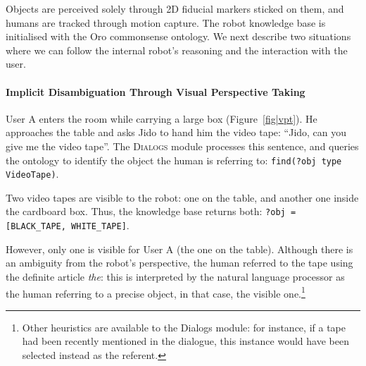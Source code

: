 \documentclass[preprint,3p,times]{elsarticle}
\newcommand{\concept}[1]{{\small \texttt{#1}}}
\begin{document}
Objects are perceived solely through 2D fiducial markers sticked on them, and humans are
tracked through motion capture. The robot knowledge base is initialised with
the {\sc Oro} commonsense ontology.  We next describe two
situations where we can follow the internal robot's reasoning and the
interaction with the user.

\paragraph{Implicit Disambiguation Through Visual Perspective Taking}

\begin{figure}[!ht]
  \centering
\end{figure}


User A enters the room while carrying a large box (Figure~\ref{fig|vpt}). He
approaches the table and asks Jido to hand him the video tape: ``Jido, can
you give me the video tape''. The \textsc{Dialogs} module processes this
sentence, and queries the ontology to
identify the object the human is referring to: \concept{find(?obj type
VideoTape)}. 

Two video tapes are visible to the robot: one on the table, and another one
inside the cardboard box. Thus, the knowledge base returns both: 
\concept{?obj = [BLACK\_TAPE, WHITE\_TAPE]}. 

However, only one is visible for User A (the one on the table). Although there is
an ambiguity from the robot's perspective, the human referred to the tape using
the definite article \emph{the}: this is interpreted by the natural language
processor as the human referring to a precise object, in that case, the visible
one.\footnote{Other heuristics are available to the {\sc Dialogs} module: for
instance, if a tape had been recently mentioned in the dialogue, this instance
would have been selected instead as the referent.}
\end{document}
